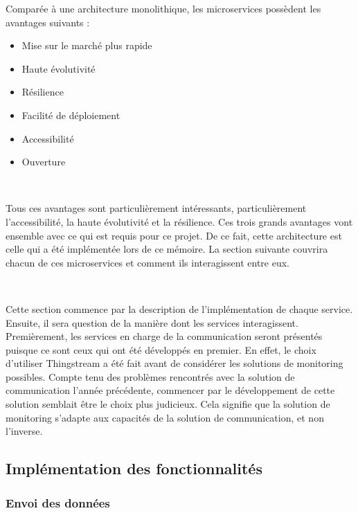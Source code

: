\noindent
Comparée à une architecture monolithique, les microservices possèdent les avantages suivants \cite{micro_diff} :

\begin{itemize}
  \item Mise sur le marché plus rapide
  \item Haute évolutivité
  \item Résilience
  \item Facilité de déploiement
  \item Accessibilité
  \item Ouverture
\end{itemize}

~

\noindent
Tous ces avantages sont particulièrement intéressants, particulièrement l'accessibilité, la haute évolutivité et la résilience. Ces trois grands avantages vont ensemble avec ce qui est requis pour ce projet. De ce fait, cette architecture est celle qui a été implémentée lors de ce mémoire. La section suivante couvrira chacun de ces microservices et comment ils interagissent entre eux.

~

\noindent
Cette section commence par la description de l'implémentation de chaque service. Ensuite, il sera question de la manière dont les services interagissent. Premièrement, les services en charge de la communication seront présentés puisque ce sont ceux qui ont été développés en premier. En effet, le choix d'utiliser Thingstream a été fait avant de considérer les solutions de monitoring possibles. Compte tenu des problèmes rencontrés avec la solution de communication l'année précédente, commencer par le développement de cette solution semblait être le choix plus judicieux. Cela signifie que la solution de monitoring s'adapte aux capacités de la solution de communication, et non l'inverse.


\subsection{Implémentation des fonctionnalités}

\subsubsection{Envoi des données}

